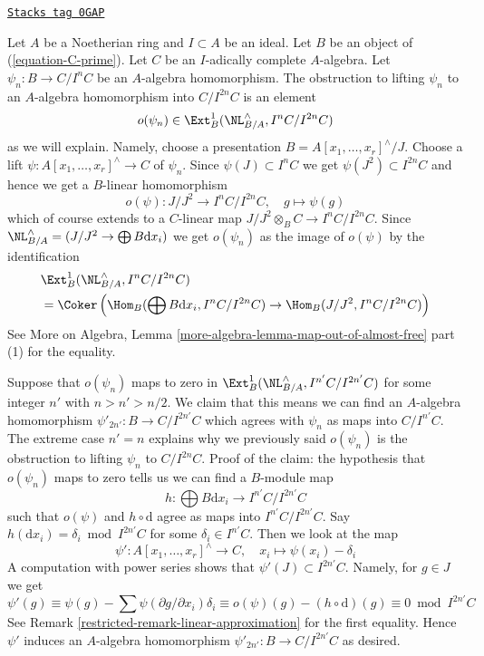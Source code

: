 \begin{remark}

\label{restricted-remark-improve-homomorphism}
\href{https://stacks.math.columbia.edu/tag/0GAP}{\texttt{Stacks tag 0GAP}}

Let $A$ be a Noetherian ring and $I \subset A$ be an ideal.
Let $B$ be an object of (\ref{equation-C-prime}).
Let $C$ be an $I$-adically complete $A$-algebra.
Let $\psi_n : B \to C/I^nC$ be an $A$-algebra homomorphism.
The obstruction to lifting $\psi_n$ to an $A$-algebra
homomorphism into $C/I^{2n}C$ is an element
$$
o(\psi_n) \in \Ext^1_B(\NL_{B/A}^\wedge, I^nC/I^{2n}C)
$$
as we will explain. Namely, choose a presentation
$B = A[x_1, \ldots, x_r]^\wedge/J$.
Choose a lift $\psi : A[x_1, \ldots, x_r]^\wedge \to C$ of $\psi_n$.
Since $\psi(J) \subset I^nC$ we get $\psi(J^2) \subset I^{2n}C$
and hence we get a $B$-linear homomorphism
$$
o(\psi) :
J/J^2 \longrightarrow I^nC/I^{2n}C, \quad g \longmapsto \psi(g)
$$
which of course extends to a $C$-linear map
$J/J^2 \otimes_B C \to I^nC/I^{2n}C$.
Since $\NL_{B/A}^\wedge = (J/J^2 \to \bigoplus B \text{d}x_i)$
we get $o(\psi_n)$ as the image of $o(\psi)$ by the identification
\begin{align*}
& \Ext^1_B(\NL_{B/A}^\wedge, I^nC/I^{2n}C) \\
& =
\Coker\left(\Hom_B(\bigoplus B\text{d}x_i, I^nC/I^{2n}C) \to
\Hom_B(J/J^2, I^nC/I^{2n}C)\right)
\end{align*}
See More on Algebra, Lemma
\ref{more-algebra-lemma-map-out-of-almost-free} part (1) for the equality.

\medskip\noindent
Suppose that $o(\psi_n)$ maps to zero in
$\Ext^1_B(\NL_{B/A}^\wedge, I^{n'}C/I^{2n'}C)$
for some integer $n'$ with $n > n' > n/2$. We claim that this means we can
find an $A$-algebra homomorphism $\psi'_{2n'} : B \to C/I^{2n'}C$
which agrees with $\psi_n$ as maps into $C/I^{n'}C$.
The extreme case $n' = n$ explains why we previously said
$o(\psi_n)$ is the obstruction to lifting $\psi_n$ to $C/I^{2n}C$.
Proof of the claim: the hypothesis that $o(\psi_n)$ maps to zero tells us
we can find a $B$-module map
$$
h : \bigoplus B\text{d}x_i \longrightarrow I^{n'}C/I^{2n'}C
$$
such that $o(\psi)$ and $h \circ \text{d}$ agree as maps
into $I^{n'}C/I^{2n'}C$. Say $h(\text{d}x_i) = \delta_i \bmod I^{2n'}C$
for some $\delta_i \in I^{n'}C$. Then we look at the map
$$
\psi' : A[x_1, \ldots, x_r]^\wedge \to C,\quad
x_i \longmapsto \psi(x_i) - \delta_i
$$
A computation with power series
shows that $\psi'(J) \subset I^{2n'}C$. Namely, for $g \in J$ we get
$$
\psi'(g) \equiv
\psi(g) - \sum \psi(\partial g/\partial x_i)\delta_i \equiv
o(\psi)(g) - (h \circ \text{d})(g) \equiv
0 \bmod I^{2n'}C
$$
See Remark \ref{restricted-remark-linear-approximation} for the first equality.
Hence $\psi'$ induces an $A$-algebra homomorphism
$\psi'_{2n'} : B \to C/I^{2n'}C$ as desired.
\end{remark}

